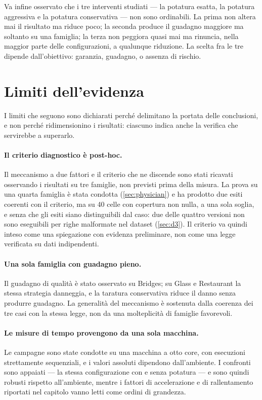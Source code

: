 Va infine osservato che i tre interventi studiati --- la potatura esatta, la potatura aggressiva e
la potatura conservativa --- non sono ordinabili. La prima non altera mai il risultato ma riduce
poco; la seconda produce il guadagno maggiore ma soltanto su una famiglia; la terza non peggiora
quasi mai ma rinuncia, nella maggior parte delle configurazioni, a qualunque riduzione. La scelta
fra le tre dipende dall'obiettivo: garanzia, guadagno, o assenza di rischio.

\section{Limiti dell'evidenza}\label{sec:res-limits}

I limiti che seguono sono dichiarati perché delimitano la portata delle conclusioni, e non perché
ridimensionino i risultati: ciascuno indica anche la verifica che servirebbe a superarlo.

\paragraph{Il criterio diagnostico è post-hoc.} Il meccanismo a due fattori e il criterio che ne
discende sono stati ricavati osservando i risultati su tre famiglie, non previsti prima della
misura. La prova su una quarta famiglia è stata condotta (\autoref{sec:physician}) e ha prodotto
due esiti coerenti con il criterio, ma su \num{40} celle con copertura non nulla, a una sola
soglia, e senza che gli esiti siano distinguibili dal caso: due delle quattro versioni non sono
eseguibili per righe malformate nel dataset (\autoref{sec:d3}). Il criterio va quindi inteso come
una spiegazione con evidenza preliminare, non come una legge verificata su dati indipendenti.

\paragraph{Una sola famiglia con guadagno pieno.} Il guadagno di qualità è stato osservato su
Bridges; su Glass e Restaurant la stessa strategia danneggia, e la taratura conservativa riduce il
danno senza produrre guadagno. La generalità del meccanismo è sostenuta dalla coerenza dei tre
casi con la stessa legge, non da una molteplicità di famiglie favorevoli.

\paragraph{Le misure di tempo provengono da una sola macchina.} Le campagne sono state condotte su
una macchina a otto core, con esecuzioni strettamente sequenziali, e i valori assoluti dipendono
dall'ambiente. I confronti sono appaiati --- la stessa configurazione con e senza potatura --- e
sono quindi robusti rispetto all'ambiente, mentre i fattori di accelerazione e di rallentamento
riportati nel capitolo vanno letti come ordini di grandezza.

